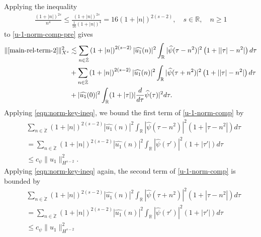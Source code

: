 \documentclass[12pt,reqno]{amsart}
\numberwithin{equation}{section}  %
\numberwithin{figure}{section}
\newcommand{\rr}{\mathbb{R}}
\newcommand{\zz}{\mathbb{Z}}
\newcommand{\wh}{\widehat}
\theoremstyle{plain}
\theoremstyle{definition}
\theoremstyle{remark}
\begin{document}
%
%
Applying the inequality
%
%
\begin{equation*}
\begin{split}
  \frac{(1 + |n|)^{2s}}{ n^{4}} \le \frac{(1 + |n|)^{2s}}{\frac{1}{16}(1 +
  |n|)^{4}} = 16 (1 + | n |)^{2(s-2)},  \quad s \in \rr, \quad n \ge 1
\end{split}
\end{equation*}
%
to \eqref{u-1-norm-comp-pre} gives
%
\begin{equation}
  \begin{split}
    \|  \eqref{main-rel-term-2}\|_{X^{s}}^{2} 
    & \lesssim \sum_{n \in \dot{\zz}} \left( 1 + |n| \right)^{2(s-2)} | \wh{u_{1}}(n)
    |^{2} \int_{\rr} | \wh{\psi}(\tau - n^{2}) |^{2}\left( 1 + | | \tau | -
    n^{2} | \right) d \tau
    \\
    & + \sum_{n \in \dot{\zz}} \left( 1 + |n| \right)^{2(s-2)} | \wh{u_{1}}(n)
    |^{2} \int_{\rr} | \wh{\psi}(\tau + n^{2}) |^{2}\left( 1 + | | \tau | -
    n^{2} | \right) d \tau
    \\
    & + |\wh{u_{1}}(0)|^{2} \int_{\rr} (1 + | \tau |) |\frac{d }{d \tau}
    \wh{\psi}(\tau)|^2 d \tau.
\end{split}
\label{u-1-norm-comp}
\end{equation}
%
%
Applying \eqref{eqn:norm-key-ineq},
we bound the first term of
\eqref{u-1-norm-comp} by
%
%
%
\begin{equation*}
  \begin{split}
    & \sum_{n \in \dot{\zz}} \left( 1 + |n| \right)^{2(s-2)} | \wh{u_{1}}(n)
    |^{2} \int_{\rr} | \wh{\psi}(\tau - n^{2}) |^{2}\left( 1 +  | \tau  -
    n^{2} | \right) d \tau
    \\
    & = \sum_{n \in \dot{\zz}} \left( 1 + |n| \right)^{2(s-2)} | \wh{u_{1}}(n)
    |^{2} \int_{\rr} | \wh{\psi}(\tau') |^{2}\left( 1 +  | \tau'| \right) d \tau
    \\
    & \le c_{\psi} \| u_{1} \|_{H^{s-2}}^{2}. 
  \end{split}
\end{equation*}
%
%
Applying
\eqref{eqn:norm-key-ineq} again, the
second term of \eqref{u-1-norm-comp} is bounded by
\begin{equation*}
  \begin{split}
    & \sum_{n \in \dot{\zz}} \left( 1 + |n| \right)^{2(s-2)} | \wh{u_{1}}(n)
    |^{2} \int_{\rr} | \wh{\psi}(\tau + n^{2}) |^{2}\left( 1 +  | \tau  -
    n^{2} | \right) d \tau
    \\
    & = \sum_{n \in \dot{\zz}} \left( 1 + |n| \right)^{2(s-2)} | \wh{u_{1}}(n)
    |^{2} \int_{\rr} | \wh{\psi}(\tau') |^{2}\left( 1 +  | \tau'| \right) d \tau
    \\
    & \le c_{\psi} \| u_{1} \|_{H^{s-2}}^{2}
  \end{split}
\end{equation*}
\end{document}
